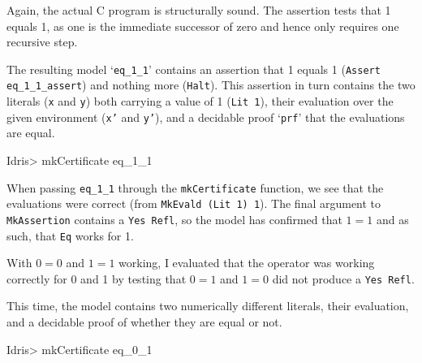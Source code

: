         \newpage
        
        
        
        Again, the actual C program is structurally sound. The assertion tests that 1 equals 1, as one is the immediate successor of zero and hence only requires one recursive step.
        
        
        The resulting \Idris model `\texttt{eq\_1\_1}' contains an assertion that 1 equals 1 (\texttt{Assert eq\_1\_1\_assert}) and nothing more (\texttt{Halt}). This assertion in turn contains the two literals (\texttt{x} and \texttt{y}) both carrying a value of 1 (\texttt{Lit 1}), their evaluation over the given environment (\texttt{x'} and \texttt{y'}), and a decidable proof `\texttt{prf}' that the evaluations are equal.
        
        \newpage
        
        \begin{code}
Idris> mkCertificate eq_1_1
        \end{code}
        
        When passing \texttt{eq\_1\_1} through the \texttt{mkCertificate} function, we see that the evaluations were correct (from \texttt{MkEvald (Lit 1) 1}). The final argument to \texttt{MkAssertion} contains a \texttt{Yes Refl}, so the model has confirmed that $1 = 1$ and as such, that \texttt{Eq} works for 1.
        
        
        
        With $0 = 0$ and $1 = 1$ working, I evaluated that the operator was working correctly for 0 and 1 by testing that $0 = 1$ and $1 = 0$ did not produce a \texttt{Yes Refl}.
        
        
        This time, the \Idris model contains two numerically different literals, their evaluation, and a decidable proof of whether they are equal or not.
        
        \begin{code}
Idris> mkCertificate eq_0_1
        \end{code}
        
